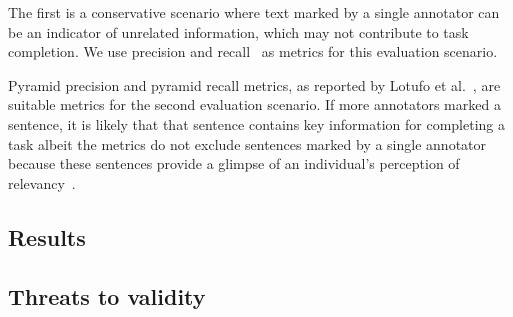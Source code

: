 The first is a conservative scenario where text marked by a single annotator can be an indicator of unrelated information, which may not contribute to task completion. 
We use precision and recall~\cite{Manning2009IR} as metrics for this evaluation scenario. 


Pyramid 
precision and pyramid recall metrics, as reported by Lotufo et al.~\cite{Nenkova2004, Lotufo2012}, are suitable metrics for the second evaluation scenario. 
If more annotators marked a sentence, it is likely that that sentence contains key information for completing a task albeit the metrics do not exclude sentences marked by a single annotator because these sentences provide a glimpse of an individual's perception of relevancy~\cite{Petrosyan2015}. 





% 












\subsection{Results}



\subsection{Threats to validity}





